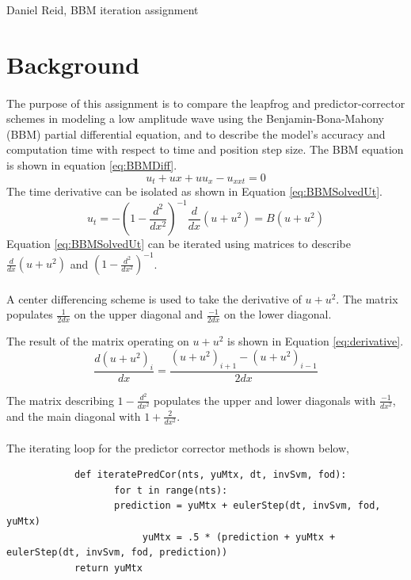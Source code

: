 \documentclass[a4paper,12pt]{article}
\begin{document}
Daniel Reid, BBM iteration assignment

\section{Background} 
	\paragraph*{}
		The purpose of this assignment is to compare the leapfrog and predictor-corrector schemes in modeling a low amplitude wave using the Benjamin-Bona-Mahony (BBM) partial differential equation, and to describe the model's accuracy and computation time with respect to time and position step size.  The BBM equation is shown in equation \ref{eq:BBMDiff}.
			\begin{equation}
				\label{eq:BBMDiff}
				u_{t} + u{x} + uu_{x} - u_{xxt} = 0
			\end{equation}
		The time derivative can be isolated as shown in Equation \ref{eq:BBMSolvedUt}.
			\begin{equation}
				\label{eq:BBMSolvedUt}
				u_{t}=-(1-\frac{d^{2}}{dx^{2}})^{-1}\frac{d}{dx}(u+u^{2}) = B(u+u^{2})
			\end{equation}
		Equation \ref{eq:BBMSolvedUt} can be iterated using matrices to describe $\frac{d}{dx}(u+u^2)$ and $(1-\frac{d^{2}}{dx^{2}})^{-1}$.  
		\paragraph*{} A center differencing scheme is used to take the derivative of $u+u^{2}$.  The matrix populates $\frac{1}{2dx}$ on the upper diagonal and $\frac{-1}{2dx}$ on the lower diagonal.  

			  The result of the matrix operating on $u+u^{2}$ is shown in Equation \ref{eq:derivative}.
			\begin{equation}
				\label{eq:derivative}
				\frac{d(u+u^{2})_{i}}{dx} = \frac{(u+u^{2})_{i+1} - (u+u^{2})_{i-1}}{2dx}
			\end{equation}

		The matrix describing $1-\frac{d^{2}}{dx^{2}}$ populates the upper and lower diagonals with $\frac{-1}{dx^{2}}$, and the main diagonal with $1 + \frac{2}{dx^{2}}$.
	\paragraph*{}
		The iterating loop for the predictor corrector methods is shown below,
		\begin{verbatim}
			def iteratePredCor(nts, yuMtx, dt, invSvm, fod):
				   for t in range(nts):
			       prediction = yuMtx + eulerStep(dt, invSvm, fod, yuMtx)
				      	yuMtx = .5 * (prediction + yuMtx + eulerStep(dt, invSvm, fod, prediction))
			return yuMtx
		\end{verbatim}
\end{document}
